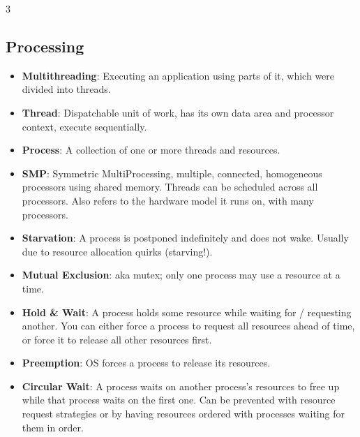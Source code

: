 \documentclass[fontsize=5pt]{scrartcl}
\begin{document}
\begin{multicols}{3}
     \subsection{Processing}
      \begin{itemize}       
       \item \textbf{Multithreading}: Executing an application using parts of it, which were divided into threads. 
       \item \textbf{Thread}: Dispatchable unit of work, has its own data area and processor context, execute sequentially.
       \item \textbf{Process}: A collection of one or more threads and resources.
       \item \textbf{SMP}: Symmetric MultiProcessing, multiple, connected, homogeneous processors using shared memory.
                           Threads can be scheduled across all processors. Also refers to the hardware model it runs on, with
                           many processors.
        \item \textbf{Starvation}: A process is postponed indefinitely and does not wake. Usually due to resource allocation quirks (starving!).
        \item \textbf{Mutual Exclusion}: aka mutex; only one process may use a resource at a time.
        \item \textbf{Hold \& Wait}: A process holds some resource while waiting for / requesting another. You can either force a process to request all resources ahead of time,
                                    or force it to release all other resources first.
        \item \textbf{Preemption}: OS forces a process to release its resources. 
        \item \textbf{Circular Wait}: A process waits on another process's resources to free up while that process waits on the first one.
                                      Can be prevented with resource request strategies or by having resources ordered with processes waiting for them in order.
      \end{itemize}

\end{multicols}
\end{document}
